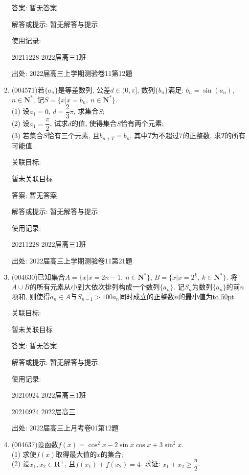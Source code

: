 \documentclass[10pt,a4paper]{article}
\newcommand{\blank}[1]{\underline{\hbox to #1pt{}}}
\begin{document}
\begin{enumerate}[1.]
答案: 暂无答案

解答或提示: 暂无解答与提示

使用记录:

20211228	2022届高三1班	


出处: 2022届高三上学期测验卷11第12题
\item { (004571)}若$\{a_n\}$是等差数列, 公差$d\in (0,\pi]$, 数列$\{b_n\}$满足: $b_n=\sin (a_n)$, $n \in \mathbf{N}^*$, 记$S=\{x|x=b_n, \ n\in \mathbf{N}^*\}$.\\
(1) 设$a_1=0$, $d=\dfrac 23 \pi$, 求集合$S$;\\
(2) 设$a_1=\dfrac\pi 2$, 试求$d$的值, 使得集合$S$恰有两个元素;\\
(3) 若集合$S$恰有三个元素, 且$b_{n+T}=b_n$, 其中$T$为不超过$7$的正整数, 求$T$的所有可能值.


关联目标:

暂未关联目标

答案: 暂无答案

解答或提示: 暂无解答与提示

使用记录:

20211228	2022届高三1班			


出处: 2022届高三上学期测验卷11第21题
\item { (004630)}已知集合$A=\{x|x=2n-1, \ n\in \mathbf{N}^*\}$, $B=\{x|x=2^k, \ k\in \mathbf{N}^*\}$. 将$A\cup B$的所有元素从小到大依次排列构成一个数列$\{a_n\}$. 记$S_n$为数列$\{a_n\}$的前$n$项和, 则使得$a_n\in A$与${S_{n-1}}>100{a_n}$同时成立的正整数$n$的最小值为\blank{50}.


关联目标:

暂未关联目标

答案: 暂无答案

解答或提示: 暂无解答与提示

使用记录:

20210924	2022届高三1班	

20210924	2022届高三	


出处: 2022届高三上月考卷01第12题
\item { (004637)}设函数$f(x)=\cos^2x-2\sin x\cos x+3\sin^2x$.\\
(1) 求使$f(x)$取得最大值的$x$的集合;\\
(2) 设$x_1,x_2\in \mathbf{R}^+$, 且$f(x_1)+f(x_2)=4$. 求证: $x_1+x_2\ge \dfrac{\pi}2$.



\end{enumerate}
\end{document}
